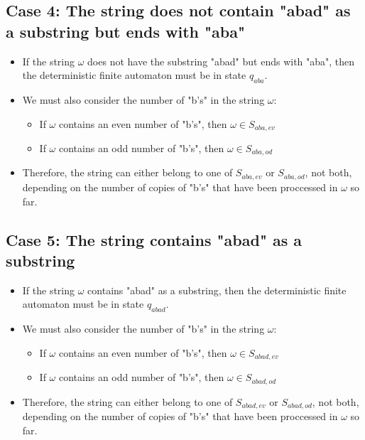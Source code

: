 \documentclass{article}
\begin{document}
\subsection*{Case 4: The string does not contain "abad" as a substring but ends with "aba"}
\begin{itemize}
    \item If the string $\omega$ does not have the substring "abad" but ends with "aba", then the deterministic finite automaton must be in state $q_{aba}$.
    \item We must also consider the number of "b's" in the string $\omega$:
    \begin{itemize}
        \item If $\omega$ contains an even number of "b's", then $\omega \in S_{aba,ev}$
        \item If $\omega$ contains an odd number of "b's", then $\omega \in S_{aba,od}$  
    \end{itemize}
    \item Therefore, the string can either belong to one of $S_{aba,ev}$ or $S_{aba,od}$, not both, depending on the number of copies of "b's" that have been proccessed in $\omega$ so far.
\end{itemize}

\subsection*{Case 5: The string contains "abad" as a substring}
\begin{itemize}
    \item If the string $\omega$ contains "abad" as a substring, then the deterministic finite automaton must be in state $q_{abad}$.
    \item We must also consider the number of "b's" in the string $\omega$:
    \begin{itemize}
        \item If $\omega$ contains an even number of "b's", then $\omega \in S_{abad,ev}$
        \item If $\omega$ contains an odd number of "b's", then $\omega \in S_{abad,od}$  
    \end{itemize}
    \item Therefore, the string can either belong to one of $S_{abad,ev}$ or $S_{abad,od}$, not both, depending on the number of copies of "b's" that have been proccessed in $\omega$ so far.
\end{itemize}
\end{document}
